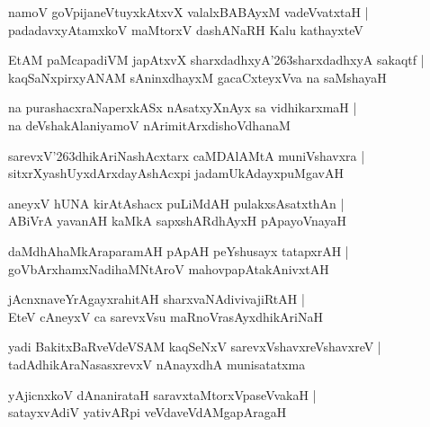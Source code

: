 \documentclass[twoside,12pt,openright]{book}
\def\S{\char'263}
\newcounter{shloka}[chapter]
\begin{document}
\begin{shloka}%
namoV goVpijaneVtuyxkAtxvX valalxBABAyxM vadeVvatxtaH |\\
padadavxyAtamxkoV maMtorxV dashANaRH Kalu kathayxteV 
\end{shloka}

\begin{shloka}%
EtAM paMcapadiVM japAtxvX sharxdadhxyA\S sharxdadhxyA sakaqtf |\\
kaqSaNxpirxyANAM sAninxdhayxM gacaCxteyxVva na saMshayaH 
\end{shloka}

\begin{shloka}%
na purashacxraNaperxkASx nAsatxyXnAyx sa vidhikarxmaH |\\
na deVshakAlaniyamoV nArimitArxdishoVdhanaM 
\end{shloka}

\begin{shloka}%
sarevxV\S dhikAriNashAcxtarx caMDAlAMtA muniVshavxra |\\
sitxrXyashUyxdArxdayAshAcxpi jadamUkAdayxpuMgavAH 
\end{shloka}

\begin{shloka}%
aneyxV hUNA kirAtAshacx puLiMdAH pulakxsAsatxthAn |\\
ABiVrA yavanAH kaMkA sapxshARdhAyxH pApayoVnayaH 
\end{shloka}

\begin{shloka}%
daMdhAhaMkAraparamAH pApAH peYshusayx tatapxrAH |\\
goVbArxhamxNadihaMNtAroV mahovpapAtakAnivxtAH 
\end{shloka}

\begin{shloka}%
jAcnxnaveYrAgayxrahitAH sharxvaNAdivivajiRtAH |\\
EteV cAneyxV ca sarevxVsu maRnoVrasAyxdhikAriNaH 
\end{shloka}

\begin{shloka}%
yadi BakitxBaRveVdeVSAM kaqSeNxV sarevxVshavxreVshavxreV |\\
tadAdhikAraNasasxrevxV nAnayxdhA munisatatxma
\end{shloka}

\begin{shloka}%
yAjicnxkoV dAnanirataH saravxtaMtorxVpaseVvakaH |\\
satayxvAdiV yativARpi veVdaveVdAMgapAragaH 
\end{shloka}
\end{document}
